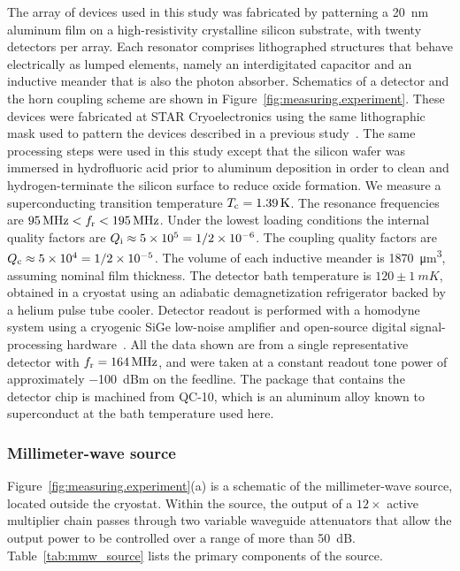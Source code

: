 The array of devices used in this study was fabricated by patterning a \SI{20}{nm} aluminum film on a high-resistivity crystalline silicon substrate, with twenty detectors per array.
Each resonator comprises lithographed structures that behave electrically as lumped elements, namely an interdigitated capacitor and an inductive meander that is also the photon absorber.
Schematics of a detector and the horn coupling scheme are shown in Figure~\ref{fig:measuring.experiment}.
These devices were fabricated at STAR Cryoelectronics using the same lithographic mask used to pattern the devices described in a previous study~\autocite{McCarrick2014RSI}.
The same processing steps were used in this study except that the silicon wafer was immersed in hydrofluoric acid prior to aluminum deposition in order to clean and hydrogen-terminate the silicon surface to reduce oxide formation.
We measure a superconducting transition temperature $T_{\mathrm{c}} = \SI{1.39}{K}$.
The resonance frequencies are $\SI{95}{MHz} < f_{\mathrm{r}} < \SI{195}{MHz}$.
Under the lowest loading conditions the internal quality factors are
$Q_{\mathrm{i}} \approx \num{5e5} = 1 / \num{2e-6}$.
The coupling quality factors are $Q_{\mathrm{c}} \approx \num{5e4} = 1 / \num{2e-5}$.
The volume of each inductive meander is \SI{1870}{\micro m^3}, assuming nominal film thickness.
The detector bath temperature is $120 \pm \SI{1}{mK}$, obtained in a cryostat using an adiabatic demagnetization refrigerator backed by a helium pulse tube cooler.
Detector readout is performed with a homodyne system using a cryogenic SiGe low-noise amplifier and open-source digital signal-processing hardware~\autocite{McCarrick2014RSI, ColumbiaCMB}.
All the data shown are from a single representative detector with $f_{\mathrm{r}} = \SI{164}{MHz}$, and were taken at a constant readout tone power of approximately \SI{-100}{dBm} on the feedline.
The package that contains the detector chip is machined from QC-10, which is an aluminum alloy known to superconduct at the bath temperature used here.

\subsubsection{Millimeter-wave source}

Figure~\ref{fig:measuring.experiment}(a) is a schematic of the millimeter-wave source, located outside the cryostat.
Within the source, the output of a $12\times$ active multiplier chain passes through two variable waveguide attenuators that allow the output power to be controlled over a range of more than \SI{50}{dB}.
Table~\ref{tab:mmw_source} lists the primary components of the source.

